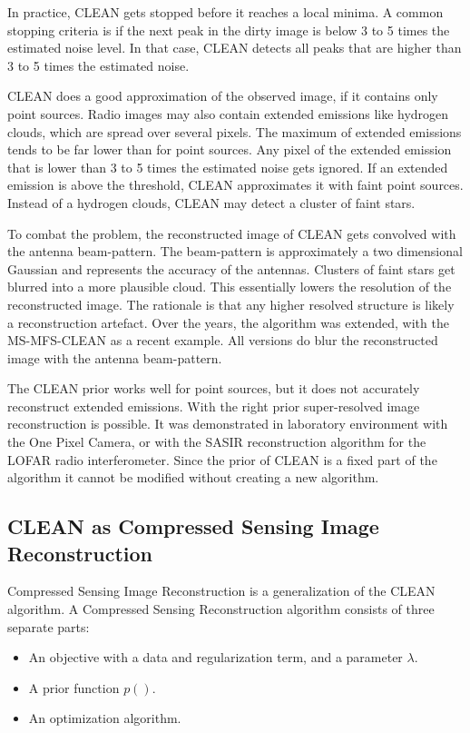 In practice, CLEAN gets stopped before it reaches a local minima. A common stopping criteria is if the next peak in the dirty image is below 3 to 5 times the estimated noise level. In that case, CLEAN detects all peaks that are higher than 3 to 5 times the estimated noise. 

CLEAN does a good approximation of the observed image, if it contains only point sources. Radio images may also contain extended emissions like hydrogen clouds, which are spread over several pixels. The maximum of extended emissions tends to be far lower than for point sources. Any pixel of the extended emission that is lower than 3 to 5 times the estimated noise gets ignored. If an extended emission is above the threshold, CLEAN approximates it with faint point sources. Instead of a hydrogen clouds, CLEAN may detect a cluster of faint stars.

To combat the problem, the reconstructed image of CLEAN gets convolved with the antenna beam-pattern. The beam-pattern is approximately a two dimensional Gaussian and represents the accuracy of the antennas. Clusters of faint stars get blurred into a more plausible cloud. This essentially lowers the resolution of the reconstructed image. The rationale is that any higher resolved structure is likely a reconstruction artefact. Over the years, the algorithm was extended, with the MS-MFS-CLEAN\cite{rau2011multi} as a recent example. All versions do blur the reconstructed image with the antenna beam-pattern.

The CLEAN prior works well for point sources, but it does not accurately reconstruct extended emissions. With the right prior super-resolved image reconstruction is possible. It was demonstrated in laboratory environment with the One Pixel Camera\cite{singlePixel}, or with the SASIR\cite{girard2015sparse} reconstruction algorithm for the LOFAR radio interferometer. Since the prior of CLEAN is a fixed part of the algorithm it cannot be modified without creating a new algorithm.


\subsection{CLEAN as Compressed Sensing Image Reconstruction}
Compressed Sensing Image Reconstruction is a generalization of the CLEAN algorithm. A Compressed Sensing Reconstruction algorithm consists of three separate parts:
\begin{itemize}
	\item An objective with a data and regularization term, and a parameter $\lambda$.
	\item A prior function $p()$.
	\item An optimization algorithm.
\end{itemize}


